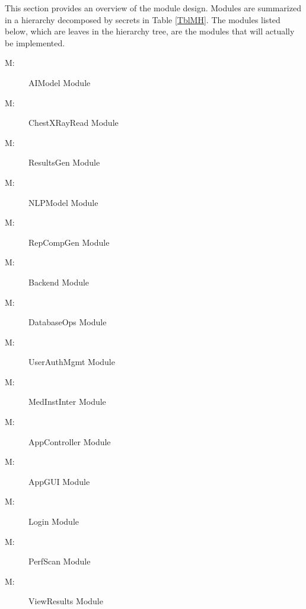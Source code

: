 \documentclass[12pt, titlepage]{article}
\newcounter{mnum}
\newcommand{\mthemnum}{M\themnum}
\begin{document}
This section provides an overview of the module design. Modules are summarized
in a hierarchy decomposed by secrets in Table \ref{TblMH}. The modules listed
below, which are leaves in the hierarchy tree, are the modules that will
actually be implemented.

\begin{multicols}{2}
\begin{description}
  \item [ \mthemnum \label{mAIModel}:] AIModel Module
  \item [ \mthemnum \label{mChXRR}:] ChestXRayRead Module
  \item [ \mthemnum \label{mResGen}:] ResultsGen Module
  \item [ \mthemnum \label{mNLPModel}:] NLPModel Module
  \item [ \mthemnum \label{mRepCompGen}:] RepCompGen Module
  \item [ \mthemnum \label{mBackend}:] Backend Module
  \item [ \mthemnum \label{mDatabaseOps}:] DatabaseOps Module
  \item [ \mthemnum \label{mUserAuthMgmt}:] UserAuthMgmt Module
  \item [ \mthemnum \label{mMedInstInter}:] MedInstInter Module
  \item [ \mthemnum \label{mAppController}:] AppController Module
  \item [ \mthemnum \label{mAppGUI}:] AppGUI Module
  \item [ \mthemnum \label{mLogin}:] Login Module
  \item [ \mthemnum \label{mPerfScan}:] PerfScan Module
  \item [ \mthemnum \label{mViewResults}:] ViewResults Module
\end{description}
\end{multicols}
\end{document}
